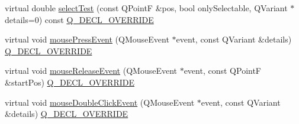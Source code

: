 \begin{DoxyCompactItemize}
\item 
virtual double \mbox{\hyperlink{class_q_c_p_text_element_a1e721bc2994a127ef5a8f0a514a5dbac}{select\+Test}} (const Q\+PointF \&pos, bool only\+Selectable, Q\+Variant $\ast$details=0) const \mbox{\hyperlink{qcustomplot_8h_a42cc5eaeb25b85f8b52d2a4b94c56f55}{Q\+\_\+\+D\+E\+C\+L\+\_\+\+O\+V\+E\+R\+R\+I\+DE}}
\item 
virtual void \mbox{\hyperlink{class_q_c_p_text_element_ad7b2c98355e3d2f912574b74fcee0574}{mouse\+Press\+Event}} (Q\+Mouse\+Event $\ast$event, const Q\+Variant \&details) \mbox{\hyperlink{qcustomplot_8h_a42cc5eaeb25b85f8b52d2a4b94c56f55}{Q\+\_\+\+D\+E\+C\+L\+\_\+\+O\+V\+E\+R\+R\+I\+DE}}
\item 
virtual void \mbox{\hyperlink{class_q_c_p_text_element_acfcbaf9b1da18745e72726aafb39c855}{mouse\+Release\+Event}} (Q\+Mouse\+Event $\ast$event, const Q\+PointF \&start\+Pos) \mbox{\hyperlink{qcustomplot_8h_a42cc5eaeb25b85f8b52d2a4b94c56f55}{Q\+\_\+\+D\+E\+C\+L\+\_\+\+O\+V\+E\+R\+R\+I\+DE}}
\item 
virtual void \mbox{\hyperlink{class_q_c_p_text_element_a2272ff775ab385f612e9fd39773de7c0}{mouse\+Double\+Click\+Event}} (Q\+Mouse\+Event $\ast$event, const Q\+Variant \&details) \mbox{\hyperlink{qcustomplot_8h_a42cc5eaeb25b85f8b52d2a4b94c56f55}{Q\+\_\+\+D\+E\+C\+L\+\_\+\+O\+V\+E\+R\+R\+I\+DE}}
\end{DoxyCompactItemize}
